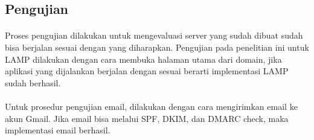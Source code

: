 \documentclass[./bab_4.tex]{subfiles}
\begin{document}
\subsection{Pengujian}

\paragraph*{}Proses pengujian dilakukan untuk mengevaluasi
server yang sudah dibuat sudah bisa berjalan sesuai dengan
yang diharapkan. Pengujian pada penelitian ini untuk LAMP 
dilakukan dengan cara membuka halaman utama dari domain,
jika aplikasi yang dijalankan berjalan dengan sesuai berarti
implementasi LAMP sudah berhasil.

\paragraph*{}Untuk prosedur pengujian email, dilakukan
dengan cara mengirimkan email ke akun Gmail. Jika email bisa
melalui SPF, DKIM, dan DMARC check, maka implementasi email
berhasil.
\end{document}
